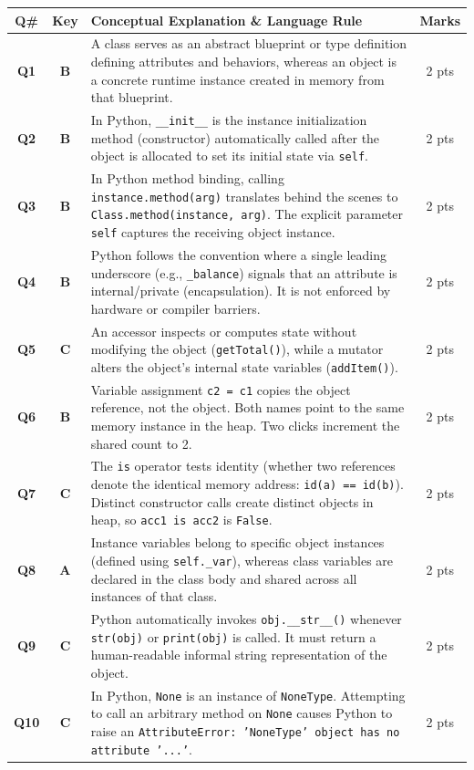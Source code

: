 \documentclass[11pt,a4paper]{article}
\begin{document}
\begin{center}
\renewcommand{\arraystretch}{1.25}
\small
\begin{tabularx}{\textwidth}{|c|c|X|c|}
\hline
\textbf{Q\#} & \textbf{Key} & \textbf{Conceptual Explanation \& Language Rule} & \textbf{Marks} \\
\hline
\textbf{Q1} & \textbf{B} & A class serves as an abstract blueprint or type definition defining attributes and behaviors, whereas an object is a concrete runtime instance created in memory from that blueprint. & 2 pts \\
\hline
\textbf{Q2} & \textbf{B} & In Python, \texttt{\_\_init\_\_} is the instance initialization method (constructor) automatically called after the object is allocated to set its initial state via \texttt{self}. & 2 pts \\
\hline
\textbf{Q3} & \textbf{B} & In Python method binding, calling \texttt{instance.method(arg)} translates behind the scenes to \texttt{Class.method(instance, arg)}. The explicit parameter \texttt{self} captures the receiving object instance. & 2 pts \\
\hline
\textbf{Q4} & \textbf{B} & Python follows the convention where a single leading underscore (e.g., \texttt{\_balance}) signals that an attribute is internal/private (encapsulation). It is not enforced by hardware or compiler barriers. & 2 pts \\
\hline
\textbf{Q5} & \textbf{C} & An accessor inspects or computes state without modifying the object (\texttt{getTotal()}), while a mutator alters the object's internal state variables (\texttt{addItem()}). & 2 pts \\
\hline
\textbf{Q6} & \textbf{B} & Variable assignment \texttt{c2 = c1} copies the object reference, not the object. Both names point to the same memory instance in the heap. Two clicks increment the shared count to 2. & 2 pts \\
\hline
\textbf{Q7} & \textbf{C} & The \texttt{is} operator tests identity (whether two references denote the identical memory address: \texttt{id(a) == id(b)}). Distinct constructor calls create distinct objects in heap, so \texttt{acc1 is acc2} is \texttt{False}. & 2 pts \\
\hline
\textbf{Q8} & \textbf{A} & Instance variables belong to specific object instances (defined using \texttt{self.\_var}), whereas class variables are declared in the class body and shared across all instances of that class. & 2 pts \\
\hline
\textbf{Q9} & \textbf{C} & Python automatically invokes \texttt{obj.\_\_str\_\_()} whenever \texttt{str(obj)} or \texttt{print(obj)} is called. It must return a human-readable informal string representation of the object. & 2 pts \\
\hline
\textbf{Q10} & \textbf{C} & In Python, \texttt{None} is an instance of \texttt{NoneType}. Attempting to call an arbitrary method on \texttt{None} causes Python to raise an \texttt{AttributeError: 'NoneType' object has no attribute '...'}. & 2 pts \\
\hline
\end{tabularx}
\end{center}
\end{document}
